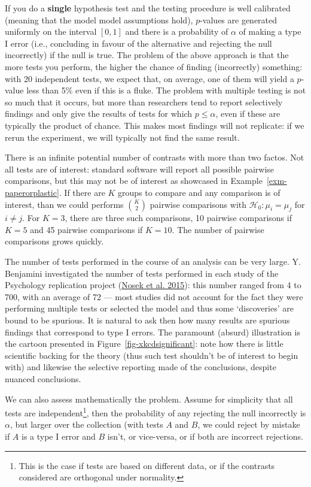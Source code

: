 \documentclass[
  11pt,
  letterpaper,
]{scrbook}
\theoremstyle{definition}
\theoremstyle{remark}
\begin{document}
If you do a \textbf{single} hypothesis test and the testing procedure is
well calibrated (meaning that the model model assumptions hold),
\(p\)-values are generated uniformly on the interval \([0,1]\) and there
is a probability of \(\alpha\) of making a type I error (i.e.,
concluding in favour of the alternative and rejecting the null
incorrectly) if the null is true. The problem of the above approach is
that the more tests you perform, the higher the chance of finding
(incorrectly) something: with 20 independent tests, we expect that, on
average, one of them will yield a \(p\)-value less than 5\% even if this
is a fluke. The problem with multiple testing is not so much that it
occurs, but more than researchers tend to report selectively findings
and only give the results of tests for which \(p \leq \alpha\), even if
these are typically the product of chance. This makes most findings will
not replicate: if we rerun the experiment, we will typically not find
the same result.

There is an infinite potential number of contrasts with more than two
factos. Not all tests are of interest: standard software will report all
possible pairwise comparisons, but this may not be of interest as
showcased in Example~\ref{exm-paperorplastic}. If there are \(K\) groups
to compare and any comparison is of interest, than we could performs
\(\binom{K}{2}\) pairwise comparisons with
\(\mathscr{H}_{0}: \mu_i = \mu_j\) for \(i \neq j\). For \(K=3\), there
are three such comparisons, 10 pairwise comparisons if \(K=5\) and 45
pairwise comparisons if \(K=10\). The number of pairwise comparisons
grows quickly.

The number of tests performed in the course of an analysis can be very
large. Y. Benjamini investigated the number of tests performed in each
study of the Psychology replication project
(\protect\hyperlink{ref-Nosek:2015}{Nosek et al. 2015}): this number
ranged from 4 to 700, with an average of 72 --- most studies did not
account for the fact they were performing multiple tests or selected the
model and thus some `discoveries' are bound to be spurious. It is
natural to ask then how many results are spurious findings that
correspond to type I errors. The paramount (absurd) illustration is the
cartoon presented in Figure~\ref{fig-xkcdsignificant}: note how there is
little scientific backing for the theory (thus such test shouldn't be of
interest to begin with) and likewise the selective reporting made of the
conclusions, despite nuanced conclusions.

We can also assess mathematically the problem. Assume for simplicity
that all tests are independent\footnote{This is the case if tests are
  based on different data, or if the contrasts considered are orthogonal
  under normality.}, then the probability of any rejecting the null
incorrectly is \(\alpha\), but larger over the collection (with tests
\(A\) and \(B\), we could reject by mistake if \(A\) is a type I error
and \(B\) isn't, or vice-versa, or if both are incorrect rejections.
\end{document}
